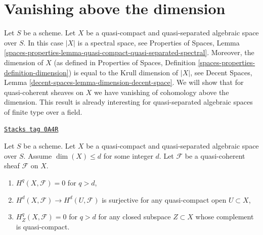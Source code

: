 \section{Vanishing above the dimension}
\label{spaces-cohomology-section-vanishing-above-dimension}
Let $S$ be a scheme. Let $X$ be a quasi-compact and quasi-separated
algebraic space over $S$. In this case $|X|$ is a spectral space, see
Properties of Spaces, Lemma
\ref{spaces-properties-lemma-quasi-compact-quasi-separated-spectral}.
Moreover, the dimension of $X$ (as defined in
Properties of Spaces, Definition \ref{spaces-properties-definition-dimension})
is equal to the Krull dimension of $|X|$, see
Decent Spaces, Lemma \ref{decent-spaces-lemma-dimension-decent-space}.
We will show that for quasi-coherent sheaves on $X$ we have vanishing of
cohomology above the dimension. This result is already interesting for
quasi-separated algebraic spaces of finite type over a field.

\begin{lemma}
\label{spaces-cohomology-lemma-vanishing-above-dimension}
\href{https://stacks.math.columbia.edu/tag/0A4R}{\texttt{Stacks tag 0A4R}}

Let $S$ be a scheme. Let $X$ be a quasi-compact and quasi-separated
algebraic space over $S$. Assume $\dim(X) \leq d$ for some integer $d$.
Let $\mathcal{F}$ be a quasi-coherent sheaf $\mathcal{F}$ on $X$.
\begin{enumerate}
\item $H^q(X, \mathcal{F}) = 0$ for $q > d$,
\item $H^d(X, \mathcal{F}) \to H^d(U, \mathcal{F})$ is surjective
for any quasi-compact open $U \subset X$,
\item $H^q_Z(X, \mathcal{F}) = 0$ for $q > d$ for any closed subspace
$Z \subset X$ whose complement is quasi-compact.
\end{enumerate}
\end{lemma}


